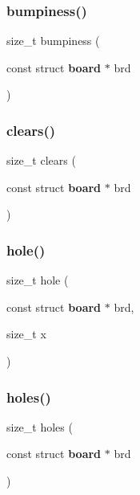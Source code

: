 \mbox{\label{tools_8c_a32300283b4df94743b9dae9d7bdaf119}} 
\subsubsection{bumpiness()}
{\footnotesize\ttfamily size\+\_\+t bumpiness (\begin{DoxyParamCaption}\item[{const struct \textbf{ board} $\ast$}]{brd }\end{DoxyParamCaption})\hspace{0.3cm}{\ttfamily [inline]}}

\mbox{\label{tools_8c_afd326c0778c693b0752754323b425bd2}} 
\subsubsection{clears()}
{\footnotesize\ttfamily size\+\_\+t clears (\begin{DoxyParamCaption}\item[{const struct \textbf{ board} $\ast$}]{brd }\end{DoxyParamCaption})\hspace{0.3cm}{\ttfamily [inline]}}

\mbox{\label{tools_8c_a1415ca3c57c0a6fdb689276670d75c90}} 
\subsubsection{hole()}
{\footnotesize\ttfamily size\+\_\+t hole (\begin{DoxyParamCaption}\item[{const struct \textbf{ board} $\ast$}]{brd,  }\item[{size\+\_\+t}]{x }\end{DoxyParamCaption})\hspace{0.3cm}{\ttfamily [inline]}}

\mbox{\label{tools_8c_a0febcc8c076fd7843176561167fabac1}} 
\subsubsection{holes()}
{\footnotesize\ttfamily size\+\_\+t holes (\begin{DoxyParamCaption}\item[{const struct \textbf{ board} $\ast$}]{brd }\end{DoxyParamCaption})\hspace{0.3cm}{\ttfamily [inline]}}

